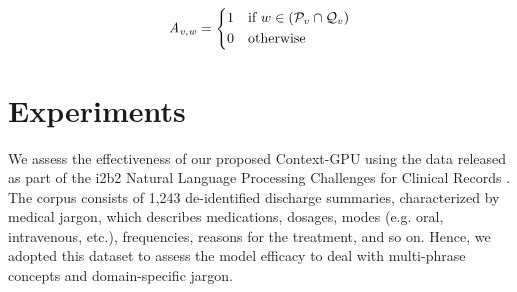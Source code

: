 \documentclass[letterpaper]{article}
\begin{document}
\begin{equation}
  \mathit{A_{v,w}}= 
  \begin{dcases}
      1 & \text{if  }  w \in (\mathcal{P}_{v} \cap \mathcal{Q}_{v})  \\
      0               & \text{otherwise}
  \end{dcases}
\label{eq:matrixA}
\end{equation}







\section{Experiments}

We assess the effectiveness of our proposed Context-GPU using the data released as part of the i2b2 Natural Language Processing Challenges for Clinical Records \cite{Uzuner10}. The corpus consists of 1,243 de-identified discharge summaries, characterized by medical jargon, which describes medications, dosages, modes (e.g. oral, intravenous, etc.), frequencies, reasons for the treatment, and so on. Hence, we adopted this dataset to assess the model efficacy to deal with multi-phrase concepts and domain-specific jargon. 
\end{document}
